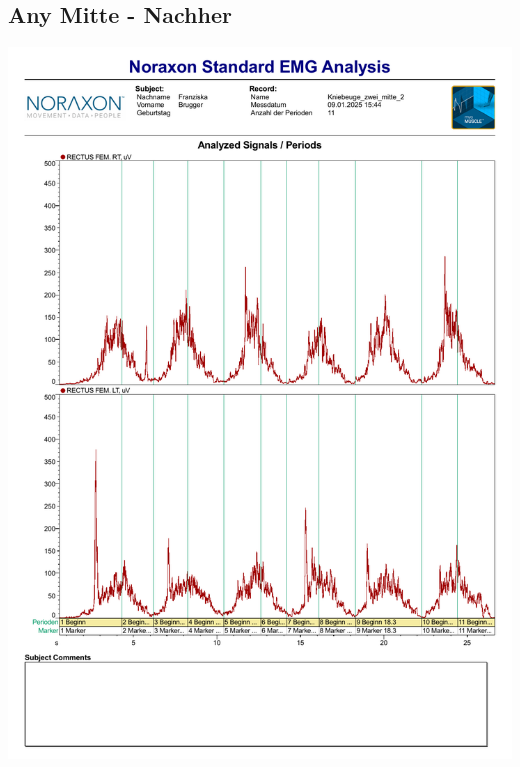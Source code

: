 \subsection*{Any Mitte - Nachher}
\includegraphics[width=.9\textwidth]{img/pdfs/Any_2_mitte.pdf}
\clearpage

